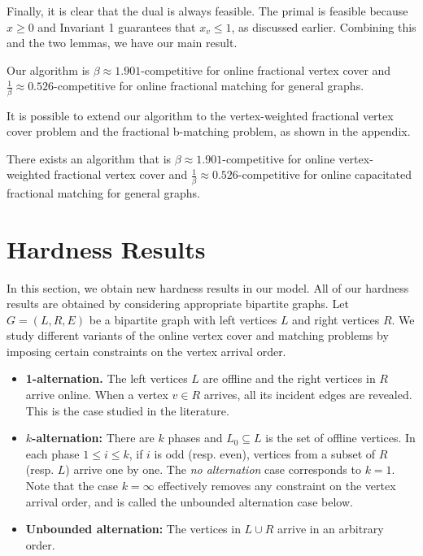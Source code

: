 \documentclass{article}
\begin{document}
Finally, it is clear that the dual is always feasible. The primal is feasible because $x\geq 0$ and Invariant 1 guarantees that $x_v\leq 1$, as discussed earlier. Combining this and the two lemmas, we have our main result.
\begin{theorem}
\label{thm:pdgeneral}
Our algorithm is $\beta\approx 1.901$-competitive for online fractional vertex cover and $\frac{1}{\beta}\approx 0.526$-competitive for online fractional matching for general graphs.
\end{theorem}


It is possible to extend our algorithm to the vertex-weighted fractional vertex cover problem and the fractional b-matching problem, as shown in the appendix.
\begin{theorem}
\label{thm:vertexweighted}
There exists an algorithm that is $\beta\approx 1.901$-competitive for online vertex-weighted fractional vertex cover and $\frac{1}{\beta}\approx 0.526$-competitive for online capacitated fractional matching for general graphs.
\end{theorem}


\section{Hardness Results}

In this section, we obtain new hardness results in our model. All of our hardness results are obtained by considering appropriate bipartite graphs.
Let $G=(L,R,E)$ be a bipartite graph with left vertices $L$ and right vertices $R$. We study different variants of the online vertex cover and matching problems by imposing certain constraints on the vertex arrival order.

\begin{itemize}
\item {\bf 1-alternation.} The left vertices $L$ are offline and the right vertices in $R$ arrive online. When a vertex $v\in R$ arrives, all its incident edges are revealed. This is the case studied in the literature.
\item {\bf $k$-alternation:}  There are $k$ phases and $L_0\subseteq L$ is the set of offline vertices. In each phase $1\leq i\leq k$, if $i$ is odd (resp. even), vertices from a subset of $R$ (resp. $L$) arrive one by one. 
The {\em no alternation} case corresponds to $k =1$.
Note that the case $k=\infty$ effectively removes any constraint on the vertex arrival order, and is called the unbounded alternation case below.
\item {\bf Unbounded alternation:} The vertices in $L\cup R$ arrive in an arbitrary order.
\end{itemize}
\end{document}
